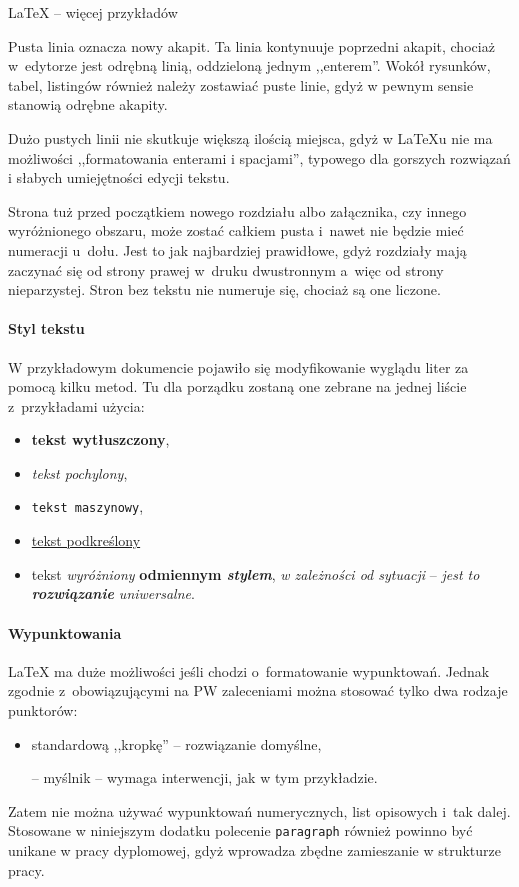\begin{easyappendix}{\LaTeX{} -- więcej przykładów}
\label{app:latex}

Pusta linia oznacza nowy akapit.
Ta linia kontynuuje poprzedni akapit, chociaż w~edytorze jest odrębną linią, oddzieloną jednym ,,enterem''. Wokół rysunków, tabel, listingów również należy zostawiać puste linie, gdyż w pewnym sensie stanowią odrębne akapity.





Dużo pustych linii nie skutkuje większą ilością miejsca, gdyż w \LaTeX{u} nie ma możliwości ,,formatowania enterami       i      spacjami'', typowego dla gorszych rozwiązań i słabych umiejętności edycji tekstu.


Strona tuż przed początkiem nowego rozdziału albo załącznika, czy innego wyróżnionego obszaru, może zostać całkiem pusta i~nawet nie będzie mieć numeracji u~dołu. Jest to jak najbardziej prawidłowe, gdyż rozdziały mają zaczynać się od strony prawej w~druku dwustronnym a~więc od strony nieparzystej. Stron bez tekstu nie numeruje się, chociaż są one liczone.

\paragraph{Styl tekstu}
W przykładowym dokumencie pojawiło się modyfikowanie wyglądu liter za pomocą kilku metod. Tu dla porządku zostaną one zebrane na jednej liście z~przykładami użycia:
\begin{itemize}
	\item \textbf{tekst wytłuszczony},
	\item \textit{tekst pochylony},
	\item \texttt{tekst maszynowy},
	\item \underline{tekst podkreślony}
	\item tekst \emph{wyróżniony} \textbf{odmiennym \emph{stylem}}, \textit{w zależności \emph{od sytuacji}} -- \emph{jest to \textbf{rozwiązanie} \textit{uniwersalne}}.
\end{itemize}

\paragraph{Wypunktowania}
\LaTeX{} ma duże możliwości jeśli chodzi o~formatowanie wypunktowań. Jednak zgodnie z~obowiązującymi na PW zaleceniami można stosować tylko dwa rodzaje punktorów:
\begin{itemize}
	\item standardową ,,kropkę'' -- rozwiązanie domyślne,
	\item[--] myślnik -- wymaga interwencji, jak w tym przykładzie.
\end{itemize}
Zatem nie można używać wypunktowań numerycznych, list opisowych i~tak dalej. Stosowane w niniejszym dodatku polecenie \texttt{paragraph} również powinno być unikane w pracy dyplomowej, gdyż wprowadza zbędne zamieszanie w strukturze pracy.


\end{easyappendix}
